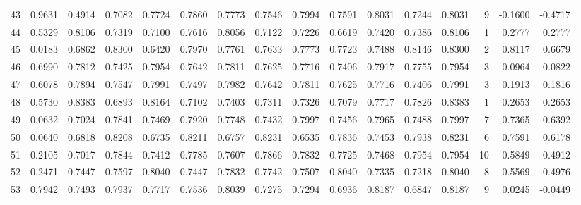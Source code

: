 \begin{tabular}{lrrrrrrrrrrrrrrr}
43  &      0.9631 &  0.4914 &  0.7082 &  0.7724 &  0.7860 &  0.7773 &  0.7546 &  0.7994 &  0.7591 &  0.8031 &   0.7244 &     0.8031 &      9 &                   -0.1600 &                    -0.4717 \\
44  &      0.5329 &  0.8106 &  0.7319 &  0.7100 &  0.7616 &  0.8056 &  0.7122 &  0.7226 &  0.6619 &  0.7420 &   0.7386 &     0.8106 &      1 &                    0.2777 &                     0.2777 \\
45  &      0.0183 &  0.6862 &  0.8300 &  0.6420 &  0.7970 &  0.7761 &  0.7633 &  0.7773 &  0.7723 &  0.7488 &   0.8146 &     0.8300 &      2 &                    0.8117 &                     0.6679 \\
46  &      0.6990 &  0.7812 &  0.7425 &  0.7954 &  0.7642 &  0.7811 &  0.7625 &  0.7716 &  0.7406 &  0.7917 &   0.7755 &     0.7954 &      3 &                    0.0964 &                     0.0822 \\
47  &      0.6078 &  0.7894 &  0.7547 &  0.7991 &  0.7497 &  0.7982 &  0.7642 &  0.7811 &  0.7625 &  0.7716 &   0.7406 &     0.7991 &      3 &                    0.1913 &                     0.1816 \\
48  &      0.5730 &  0.8383 &  0.6893 &  0.8164 &  0.7102 &  0.7403 &  0.7311 &  0.7326 &  0.7079 &  0.7717 &   0.7826 &     0.8383 &      1 &                    0.2653 &                     0.2653 \\
49  &      0.0632 &  0.7024 &  0.7841 &  0.7469 &  0.7920 &  0.7748 &  0.7432 &  0.7997 &  0.7456 &  0.7965 &   0.7488 &     0.7997 &      7 &                    0.7365 &                     0.6392 \\
50  &      0.0640 &  0.6818 &  0.8208 &  0.6735 &  0.8211 &  0.6757 &  0.8231 &  0.6535 &  0.7836 &  0.7453 &   0.7938 &     0.8231 &      6 &                    0.7591 &                     0.6178 \\
51  &      0.2105 &  0.7017 &  0.7844 &  0.7412 &  0.7785 &  0.7607 &  0.7866 &  0.7832 &  0.7725 &  0.7468 &   0.7954 &     0.7954 &     10 &                    0.5849 &                     0.4912 \\
52  &      0.2471 &  0.7447 &  0.7597 &  0.8040 &  0.7447 &  0.7832 &  0.7742 &  0.7507 &  0.8040 &  0.7335 &   0.7218 &     0.8040 &      8 &                    0.5569 &                     0.4976 \\
53  &      0.7942 &  0.7493 &  0.7937 &  0.7717 &  0.7536 &  0.8039 &  0.7275 &  0.7294 &  0.6936 &  0.8187 &   0.6847 &     0.8187 &      9 &                    0.0245 &                    -0.0449 \\

\end{tabular}
